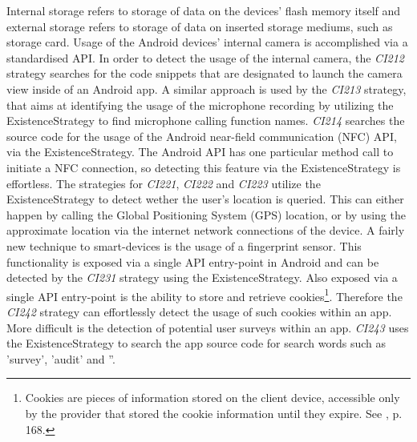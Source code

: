 Internal storage refers to storage of data on the devices' flash memory itself and external storage refers to storage of data on inserted storage mediums, such as storage card.
Usage of the Android devices' internal camera is accomplished via a standardised \acs{API}.
In order to detect the usage of the internal camera, the \textit{CI212} strategy searches for the code snippets that are designated to launch the camera view inside of an Android app.
A similar approach is used by the \textit{CI213} strategy, that aims at identifying the usage of the microphone recording by utilizing the ExistenceStrategy to find microphone calling function names.
\textit{CI214} searches the source code for the usage of the Android near-field communication (\acs{NFC}) API, via the ExistenceStrategy.
The Android API has one particular method call to initiate a NFC connection, so detecting this feature via the ExistenceStrategy is effortless.
The strategies for \textit{CI221}, \textit{CI222} and \textit{CI223} utilize the ExistenceStrategy to detect wether the user's location is queried.
This can either happen by calling the Global Positioning System (\acs{GPS}) location, or by using the approximate location via the internet network connections of the device.
A fairly new technique to smart-devices is the usage of a fingerprint sensor. 
This functionality is exposed via a single API entry-point in Android and can be detected by the \textit{CI231} strategy using the ExistenceStrategy.
Also exposed via a single API entry-point is the ability to store and retrieve cookies\footnote{Cookies are pieces of information stored on the client device, accessible only by the provider that stored the cookie information until they expire. See \cite{Laudon2010}, p. 168.}.
Therefore the \textit{CI242} strategy can effortlessly detect the usage of such cookies within an app.
More difficult is the detection of potential user surveys within an app.
\textit{CI243} uses the ExistenceStrategy to search the app source code for search words such as 'survey', 'audit' and ''.

